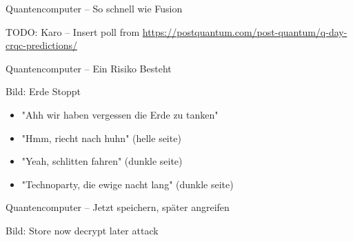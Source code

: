 
\begin{frame}[T]{Quantencomputer – So schnell wie Fusion}

TODO: Karo – Insert poll from \url{https://postquantum.com/post-quantum/q-day-crqc-predictions/}

\end{frame}


\begin{frame}[T]{Quantencomputer – Ein Risiko Besteht}

Bild: Erde Stoppt
\begin{itemize}
  \item "Ahh wir haben vergessen die Erde zu tanken"
  \item "Hmm, riecht nach huhn" (helle seite)
  \item "Yeah, schlitten fahren" (dunkle seite)
  \item "Technoparty, die ewige nacht lang" (dunkle seite)
\end{itemize}

\end{frame}


\begin{frame}[T]{Quantencomputer – Jetzt speichern, später angreifen}

Bild: Store now decrypt later attack

\end{frame}

